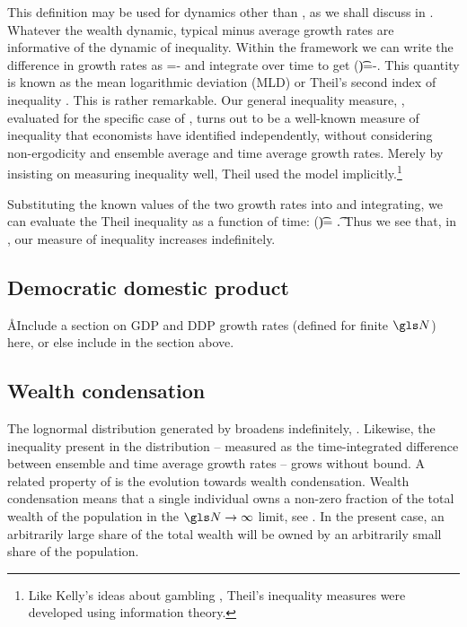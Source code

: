 This definition may be used for dynamics other than
\GBM, as we shall discuss in . Whatever the wealth dynamic, typical minus average growth rates are informative of the
dynamic of inequality. Within the \GBM framework we can write the difference in growth rates as 
\be
\frac{\gd \J}{\gd\t}=\frac{\gd \ln \ave{\x}}{\gd\t}-\frac{\gd \ave{\ln \x}}{\gd\t}
\ee
and integrate over time to get
\be
\J(\t)=\ln \ave{\x(\t)}-\ave{\ln \x(\t)}.
\ee
This quantity is known as the mean logarithmic deviation (MLD) or Theil's second index of inequality \cite{Theil1967}. 
This is rather remarkable. Our general inequality measure, , evaluated 
for the specific case of \GBM, turns out to be a well-known measure of inequality that 
economists have identified independently, without considering non-ergodicity and ensemble 
average and time average growth rates. Merely by insisting on measuring inequality well,
Theil used the \GBM model implicitly.\footnote{Like Kelly's ideas about gambling \cite{Kelly1956}, Theil's inequality measures were developed using information theory.}

Substituting the known values of the two growth rates into  and integrating, we can evaluate the Theil inequality as a function of time:
\be
\J(\t)= \t.
\ee
Thus we see that, in \GBM, our measure of inequality increases indefinitely.


\subsection{Democratic domestic product}

\AA{Include a section on GDP and DDP growth rates (defined for finite $\N$) here, or else include in the section above.}

\subsection{Wealth condensation}
The lognormal distribution generated by \GBM broadens indefinitely, . Likewise, the inequality present in the distribution -- measured as the time-integrated difference between ensemble and time average growth rates -- grows without bound. A related property of \GBM is the evolution towards wealth condensation. Wealth condensation means that a single individual owns a non-zero fraction of the total wealth of the population in the $\N\to\infty$ limit, see \eg \cite{BouchaudMezard2000}. In the present case, an arbitrarily large share of the  total wealth will be owned by an arbitrarily small share of the population.

